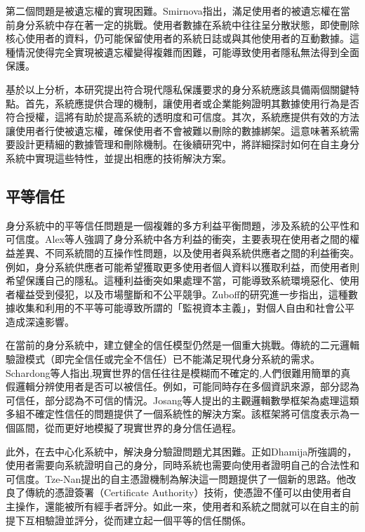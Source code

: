 第二個問題是被遺忘權的實現困難。Smirnova\cite{smirnova2024understanding}指出，滿足使用者的被遺忘權在當前身分系統中存在著一定的挑戰。使用者數據在系統中往往呈分散狀態，即使刪除核心使用者的資料，仍可能保留使用者的系統日誌或與其他使用者的互動數據。這種情況使得完全實現被遺忘權變得複雜而困難，可能導致使用者隱私無法得到全面保護。

基於以上分析，本研究提出符合現代隱私保護要求的身分系統應該具備兩個關鍵特點。首先，系統應提供合理的機制，讓使用者或企業能夠證明其數據使用行為是否符合授權，這將有助於提高系統的透明度和可信度。其次，系統應提供有效的方法讓使用者行使被遺忘權，確保使用者不會被難以刪除的數據綁架。這意味著系統需要設計更精細的數據管理和刪除機制。在後續研究中，將詳細探討如何在自主身分系統中實現這些特性，並提出相應的技術解決方案。
\subsection{平等信任}
身分系統中的平等信任問題是一個複雜的多方利益平衡問題，涉及系統的公平性和可信度。Alex等人\cite{preukschat2021self}強調了身分系統中各方利益的衝突，主要表現在使用者之間的權益差異、不同系統間的互操作性問題，以及使用者與系統供應者之間的利益衝突。例如，身分系統供應者可能希望獲取更多使用者個人資料以獲取利益，而使用者則希望保護自己的隱私。這種利益衝突如果處理不當，可能導致系統環境惡化、使用者權益受到侵犯，以及市場壟斷和不公平競爭。Zuboff\cite{zhang2010security}的研究進一步指出，這種數據收集和利用的不平等可能導致所謂的「監視資本主義」，對個人自由和社會公平造成深遠影響。

在當前的身分系統中，建立健全的信任模型仍然是一個重大挑戰。傳統的二元邏輯驗證模式（即完全信任或完全不信任）已不能滿足現代身分系統的需求。Schardong等人\cite{s22155641}指出,現實世界的信任往往是模糊而不確定的,人們很難用簡單的真假邏輯分辨使用者是否可以被信任。例如，可能同時存在多個資訊來源，部分認為可信任，部分認為不可信的情況。Josang等人\cite{josang2006exploring}提出的主觀邏輯數學框架為處理這類多組不確定性信任的問題提供了一個系統性的解決方案。該框架將可信度表示為一個區間，從而更好地模擬了現實世界的身分信任過程。

此外，在去中心化系統中，解決身分驗證問題尤其困難。正如Dhamija\cite{dhamija2008sevenflaws}所強調的，使用者需要向系統證明自己的身分，同時系統也需要向使用者證明自己的合法性和可信度。Tze-Nan\cite{NTU202102846}提出的自主憑證機制為解決這一問題提供了一個新的思路。他改良了傳統的憑證簽署（Certificate Authority）技術，使憑證不僅可以由使用者自主操作，還能被所有經手者評分。如此一來，使用者和系統之間就可以在自主的前提下互相驗證並評分，從而建立起一個平等的信任關係。

